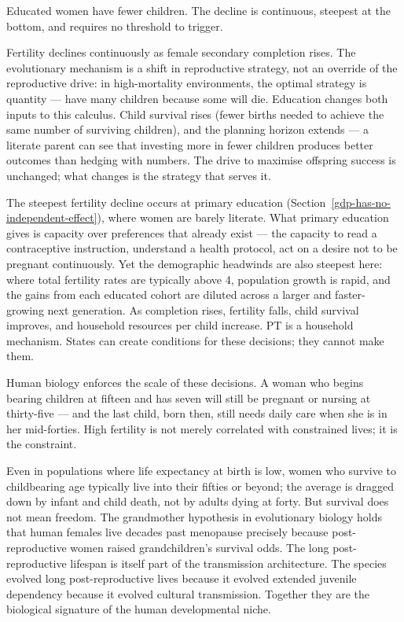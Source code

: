 \documentclass[12pt,letterpaper]{article}
\begin{document}
Educated women have fewer children. The decline is continuous, steepest at the bottom, and requires no threshold to trigger.

Fertility declines continuously as female secondary
completion rises. The evolutionary mechanism is a shift in reproductive
strategy, not an override of the reproductive drive: in high-mortality
environments, the optimal strategy is quantity --- have many children
because some will die. Education changes both inputs to this calculus.
Child survival rises (fewer births needed to achieve the same number of
surviving children), and the planning horizon extends --- a literate
parent can see that investing more in fewer children produces better
outcomes than hedging with numbers. The drive to maximise offspring
success is unchanged; what changes is the strategy that serves it.

The steepest fertility decline occurs at primary education
(Section~\ref{gdp-has-no-independent-effect}), where women are barely
literate. What primary education gives is capacity over preferences that
already exist --- the capacity to read a contraceptive instruction,
understand a health protocol, act on a desire not to be pregnant
continuously. Yet the demographic headwinds are also steepest here:
where total fertility rates are typically above 4, population growth is
rapid, and the gains from each educated cohort are diluted across a
larger and faster-growing next generation. As completion rises, fertility
falls, child survival improves, and household resources per child
increase. PT is a
household mechanism. States can create conditions for these decisions; they
cannot make them.

Human biology enforces the scale of these decisions. A woman who begins
bearing children at fifteen and has seven will still be pregnant or
nursing at thirty-five --- and the last child, born then, still needs
daily care when she is in her mid-forties. High fertility is not merely
correlated with constrained lives; it is the constraint.

Even in populations where life expectancy at birth is low, women who
survive to childbearing age typically live into their fifties or beyond;
the average is dragged down by infant and child death, not by adults
dying at forty. But survival does not mean freedom. The grandmother
hypothesis in evolutionary biology holds that human females live decades
past menopause precisely because post-reproductive women raised
grandchildren's survival odds. The long post-reproductive lifespan is
itself part of the transmission architecture. The species
evolved long post-reproductive lives because it evolved extended
juvenile dependency because it evolved cultural transmission. Together
they are the biological signature of the human developmental niche.
\end{document}
